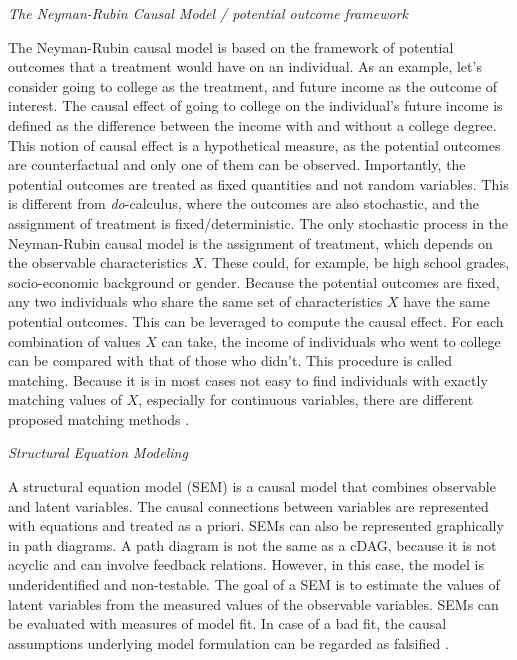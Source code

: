\documentclass[nobib]{tufte-handout}
\newcommand{\docalc}{\emph{do}-calculus\xspace}
\begin{document}
\begin{InfoBox}
\centering
\colorbox{mygray}{
  \centering
  \begin{minipage}{1\textwidth}
    \medskip

    \emph{The Neyman-Rubin Causal Model / potential outcome framework}
    \medskip

    The Neyman-Rubin causal model is based on the framework of potential outcomes that a treatment would have on an individual.
    As an example, let's consider going to college as the treatment, and future income as the outcome of interest.
    The causal effect of going to college on the individual's future income is defined as the difference between the income with and without a college degree.
    This notion of causal effect is a hypothetical measure, as the potential outcomes are counterfactual and only one of them can be observed.
    Importantly, the potential outcomes are treated as fixed quantities and not random variables.
    This is different from \docalc, where the outcomes are also stochastic, and the assignment of treatment is fixed/deterministic.
    The only stochastic process in the Neyman-Rubin causal model is the assignment of treatment, which depends on the observable characteristics $X$.
    These could, for example, be high school grades, socio-economic background or gender.
    Because the potential outcomes are fixed, any two individuals who share the same set of characteristics $X$ have the same potential outcomes.
    This can be leveraged to compute the causal effect.
    For each combination of values $X$ can take, the income of individuals who went to college can be compared with that of those who didn't.
    This procedure is called matching.
    Because it is in most cases not easy to find individuals with exactly matching values of $X$, especially for continuous variables, there are different proposed matching methods \citep{sekhon2008neyman}.

    \medskip

    \emph{Structural Equation Modeling}
    \medskip

    A structural equation model (SEM) is a causal model that combines observable and latent variables.
    The causal connections between variables are represented with equations and treated as a priori.
    SEMs can also be represented graphically in path diagrams.
    A path diagram is not the same as a cDAG, because it is not acyclic and can involve feedback relations. However, in this case, the model is underidentified and non-testable.
    The goal of a SEM is to estimate the values of latent variables from the measured values of the observable variables.
    SEMs can be evaluated with measures of model fit.
    In case of a bad fit, the causal assumptions underlying model formulation can be regarded as falsified \citep{bollen2013eight}.


\end{minipage}}
\end{InfoBox}
\end{document}
